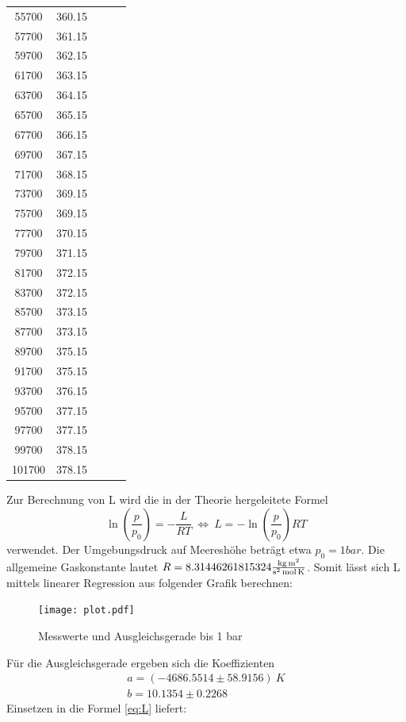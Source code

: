 \begin{table}[H]
\begin{tabular}{c c c c c}
      55700 &   360.15 \\ 
      57700 &   361.15 \\ 
      59700 &   362.15 \\ 
      61700 &   363.15 \\ 
      63700 &   364.15 \\ 
      65700 &   365.15 \\ 
      67700 &   366.15 \\ 
      69700 &   367.15 \\ 
      71700 &   368.15 \\ 
      73700 &   369.15 \\ 
      75700 &   369.15 \\ 
      77700 &   370.15 \\ 
      79700 &   371.15 \\ 
      81700 &   372.15 \\ 
      83700 &   372.15 \\ 
      85700 &   373.15 \\ 
      87700 &   373.15 \\
      89700 &   375.15 \\ 
      91700 &   375.15 \\ 
      93700 &   376.15 \\ 
      95700 &   377.15 \\ 
      97700 &   377.15 \\ 
      99700 &   378.15 \\ 
      101700 &   378.15 \\ 
    \bottomrule
    \end{tabular}
  \end{table}

  \noindent Zur Berechnung von L wird die in der Theorie hergeleitete Formel 
  \begin{equation}
    \label{eq:L}
    \ln{(\dfrac{p}{p_0})}=-\dfrac{L}{RT}\ \Leftrightarrow \ L=-\ln{(\dfrac{p}{p_0})}RT
  \end{equation} 
  verwendet. Der Umgebungsdruck auf Meereshöhe beträgt etwa
  $p_0=1 bar$. Die allgemeine Gaskonstante lautet $R=8.31446261815324
  {\displaystyle \textstyle {\frac {\mathrm {kg\,m^{2}} }{\mathrm {s^{2}\,mol\,K} }}} $. Somit lässt 
  sich L mittels linearer Regression aus folgender Grafik berechnen: 
  \begin{figure}[H]
   \centering
   \texttt{[image: plot.pdf]}
   \caption{Messwerte und Ausgleichsgerade bis 1 bar}
   \label{fig:plot}
  \end{figure}
  \noindent Für die Ausgleichsgerade ergeben sich die Koeffizienten
  \begin{align*}
   a=(-4686.5514 \pm 58.9156)\ K\\
   b=10.1354 \pm 0.2268
  \end{align*}
  \noindent Einsetzen in die Formel \eqref{eq:L} liefert:

